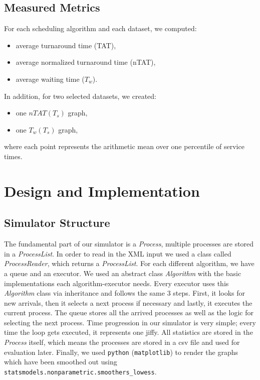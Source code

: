 \documentclass[a4paper,11pt]{article}
\begin{document}
\subsection{Measured Metrics}
For each scheduling algorithm and each dataset, we computed:
\begin{itemize}[leftmargin=1.5em]
    \item average turnaround time (TAT),
    \item average normalized turnaround time (nTAT),
    \item average waiting time ($T_w$).
\end{itemize}

In addition, for two selected datasets, we created:
\begin{itemize}[leftmargin=1.5em]
    \item one $nTAT(T_s)$ graph,
    \item one $T_w(T_s)$ graph,
\end{itemize}
where each point represents the arithmetic mean over one percentile of service times.

\section{Design and Implementation}

\subsection{Simulator Structure}
The fundamental part of our simulator is a \emph{Process}, multiple processes are stored in a \emph{ProcessList}.
In order to read in the XML input we used a class called \emph{ProcessReader}, which returns a \emph{ProcessList}.
For each different algorithm, we have a queue and an executor.
We used an abstract class \emph{Algorithm} with the basic implementations each algorithm-executor needs.
Every executor uses this \emph{Algorithm} class via inheritance and follows the same 3 steps.
First, it looks for new arrivals, then it selects a next process if necessary and lastly, it executes the current process.
The queue stores all the arrived processes as well as the logic for selecting the next process.
Time progression in our simulator is very simple; every time the loop gets executed, it represents one jiffy.
All statistics are stored in the \emph{Process} itself, which means the processes are stored in a csv file and used for evaluation later.
Finally, we used \texttt{python} (\texttt{matplotlib}) to render the graphs which have been smoothed out using \texttt{statsmodels.nonparametric.smoothers\_lowess}.
\end{document}
